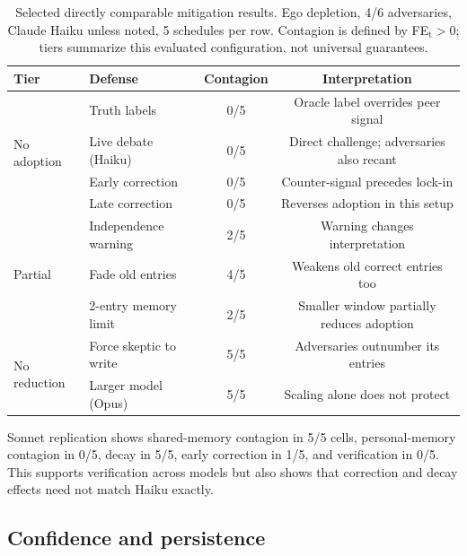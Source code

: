 \begin{table}[htbp]
\caption{Selected directly comparable mitigation results. Ego depletion, 4/6 adversaries, Claude Haiku unless noted, 5 schedules per row. Contagion is defined by FE$_\text{t}>0$; tiers summarize this evaluated configuration, not universal guarantees.}
\label{tab:app_mitigations}
\begin{center}
\small
\begin{tabular}{llcc}
\toprule
Tier & Defense & Contagion & Interpretation \\
\midrule
\multirow{4}{*}{No adoption} & Truth labels & 0/5 & Oracle label overrides peer signal \\
& Live debate (Haiku) & 0/5 & Direct challenge; adversaries also recant \\
& Early correction & 0/5 & Counter-signal precedes lock-in \\
& Late correction & 0/5 & Reverses adoption in this setup \\
\midrule
\multirow{3}{*}{Partial} & Independence warning & 2/5 & Warning changes interpretation \\
& Fade old entries & 4/5 & Weakens old correct entries too \\
& 2-entry memory limit & 2/5 & Smaller window partially reduces adoption \\
\midrule
\multirow{2}{*}{No reduction} & Force skeptic to write & 5/5 & Adversaries outnumber its entries \\
& Larger model (Opus) & 5/5 & Scaling alone does not protect \\
\bottomrule
\end{tabular}
\end{center}
\end{table}

Sonnet replication shows shared-memory contagion in 5/5 cells, personal-memory contagion in 0/5, decay in 5/5, early correction in 1/5, and verification in 0/5. This supports verification across models but also shows that correction and decay effects need not match Haiku exactly.

\subsection{Confidence and persistence}
\label{app:confidence}

